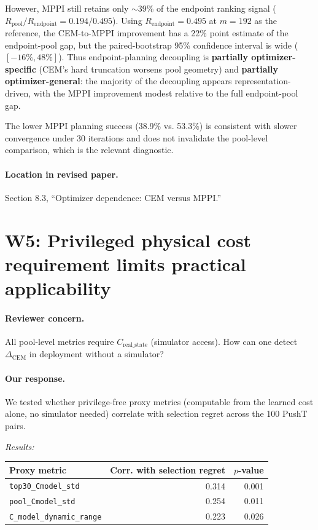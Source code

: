 \documentclass[11pt]{article}
\newcommand{\Rendpoint}{R_{\mathrm{endpoint}}}
\newcommand{\Rpool}{R_{\mathrm{pool}}}
\newcommand{\DeltaCEM}{\Delta_{\mathrm{CEM}}}
\newcommand{\Creal}{C_{\mathrm{real\_state}}}
\begin{document}
However, MPPI still retains only $\sim$39\% of the endpoint ranking signal ($\Rpool/\Rendpoint = 0.194/0.495$). Using $\Rendpoint = 0.495$ at $m=192$ as the reference, the CEM-to-MPPI improvement has a 22\% point estimate of the endpoint-pool gap, but the paired-bootstrap 95\% confidence interval is wide ($[-16\%,48\%]$). Thus endpoint-planning decoupling is \textbf{partially optimizer-specific} (CEM's hard truncation worsens pool geometry) and \textbf{partially optimizer-general}: the majority of the decoupling appears representation-driven, with the MPPI improvement modest relative to the full endpoint-pool gap.

The lower MPPI planning success (38.9\% vs. 53.3\%) is consistent with slower convergence under 30 iterations and does not invalidate the pool-level comparison, which is the relevant diagnostic.

\paragraph{Location in revised paper.}
Section 8.3, ``Optimizer dependence: CEM versus MPPI.''

\section*{W5: Privileged physical cost requirement limits practical applicability}

\paragraph{Reviewer concern.}
All pool-level metrics require $\Creal$ (simulator access). How can one detect $\DeltaCEM$ in deployment without a simulator?

\paragraph{Our response.}
We tested whether privilege-free proxy metrics (computable from the learned cost alone, no simulator needed) correlate with selection regret across the 100 PushT pairs.

\textit{Results:}

\begin{center}
\begin{tabular}{lrr}
\toprule
Proxy metric & Corr. with selection regret & $p$-value \\
\midrule
\texttt{top30\_Cmodel\_std} & 0.314 & 0.001 \\
\texttt{pool\_Cmodel\_std} & 0.254 & 0.011 \\
\texttt{C\_model\_dynamic\_range} & 0.223 & 0.026 \\
\bottomrule
\end{tabular}
\end{center}
\end{document}

